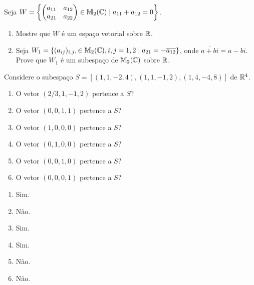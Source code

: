 \documentclass[12pt]{exam}
\begin{document}
\begin{exercicio}
  Seja $W = \left\{\begin{pmatrix} a_{11} & a_{12}\\ a_{21} & a_{22}\end{pmatrix} \in \mathbb{M}_2(\mathbb{C}) \mid a_{11} + a_{12} = 0\right\}$.
  \begin{enumerate}[label={\alph*})]
    \item Mostre que $W$ é um espaço vetorial sobre $\mathbb{R}$.

    \item Seja $W_1 = \{(a_{ij})_{i,j}, \in \mathbb{M}_2(\mathbb{C}), i, j = 1, 2 \mid a_{21} = -\overline{a_{12}}\}$, onde $\overline{a + bi} = a - bi$. Prove que $W_1$ é um subespaço de $\mathbb{M}_2(\mathbb{C})$ sobre $\mathbb{R}$.
  \end{enumerate}
\end{exercicio}

\begin{exercicio}
  Considere o subespaço $S = [(1,1,-2,4),(1,1,-1,2),(1,4,-4,8)]$ de $\mathbb{R}^4$.
  \begin{enumerate}[label={\alph*})]
    \item O vetor $(2/3, 1, -1, 2)$ pertence a $S$?

    \item O vetor $(0, 0, 1, 1)$ pertence a $S$?

    \item O vetor $(1, 0, 0, 0)$ pertence a $S$?

    \item O vetor $(0, 1, 0, 0)$ pertence a $S$?

    \item O vetor $(0, 0, 1, 0)$ pertence a $S$?

    \item O vetor $(0, 0, 0, 1)$ pertence a $S$?
  \end{enumerate}
  \begin{solucao}
    \begin{multicols}{3}
      \begin{enumerate}[label={\alph*})]
        \item Sim.

        \item Não.

        \item Sim.

        \item Sim.

        \item Não.

        \item Não.
      \end{enumerate}
    \end{multicols}
  \end{solucao}
\end{exercicio}
\end{document}
